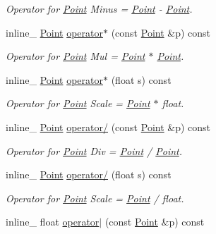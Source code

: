 \begin{DoxyCompactItemize}
\begin{DoxyCompactList}\small\item\em Operator for \hyperlink{classPoint}{Point} Minus = \hyperlink{classPoint}{Point} -\/ \hyperlink{classPoint}{Point}. \end{DoxyCompactList}\item 
inline\+\_\+ \hyperlink{classPoint}{Point} \hyperlink{classPoint_a0bad2f6e7e2caf7a0e639f3ba0f9bbc8}{operator$\ast$} (const \hyperlink{classPoint}{Point} \&p) const \hypertarget{classPoint_a0bad2f6e7e2caf7a0e639f3ba0f9bbc8}{}\label{classPoint_a0bad2f6e7e2caf7a0e639f3ba0f9bbc8}

\begin{DoxyCompactList}\small\item\em Operator for \hyperlink{classPoint}{Point} Mul = \hyperlink{classPoint}{Point} $\ast$ \hyperlink{classPoint}{Point}. \end{DoxyCompactList}\item 
inline\+\_\+ \hyperlink{classPoint}{Point} \hyperlink{classPoint_a4b3ce25b1180271c2bc7b33bd2755160}{operator$\ast$} (float s) const \hypertarget{classPoint_a4b3ce25b1180271c2bc7b33bd2755160}{}\label{classPoint_a4b3ce25b1180271c2bc7b33bd2755160}

\begin{DoxyCompactList}\small\item\em Operator for \hyperlink{classPoint}{Point} Scale = \hyperlink{classPoint}{Point} $\ast$ float. \end{DoxyCompactList}\item 
inline\+\_\+ \hyperlink{classPoint}{Point} \hyperlink{classPoint_a037936b3197c2210ec25a2a2819408a5}{operator/} (const \hyperlink{classPoint}{Point} \&p) const \hypertarget{classPoint_a037936b3197c2210ec25a2a2819408a5}{}\label{classPoint_a037936b3197c2210ec25a2a2819408a5}

\begin{DoxyCompactList}\small\item\em Operator for \hyperlink{classPoint}{Point} Div = \hyperlink{classPoint}{Point} / \hyperlink{classPoint}{Point}. \end{DoxyCompactList}\item 
inline\+\_\+ \hyperlink{classPoint}{Point} \hyperlink{classPoint_aca070237fde514ce1b1a4c315b18980b}{operator/} (float s) const \hypertarget{classPoint_aca070237fde514ce1b1a4c315b18980b}{}\label{classPoint_aca070237fde514ce1b1a4c315b18980b}

\begin{DoxyCompactList}\small\item\em Operator for \hyperlink{classPoint}{Point} Scale = \hyperlink{classPoint}{Point} / float. \end{DoxyCompactList}\item 
inline\+\_\+ float \hyperlink{classPoint_a6293b6c133a4d1dcbd0c78ae5efe989b}{operator$\vert$} (const \hyperlink{classPoint}{Point} \&p) const \hypertarget{classPoint_a6293b6c133a4d1dcbd0c78ae5efe989b}{}\label{classPoint_a6293b6c133a4d1dcbd0c78ae5efe989b}


\end{DoxyCompactItemize}
